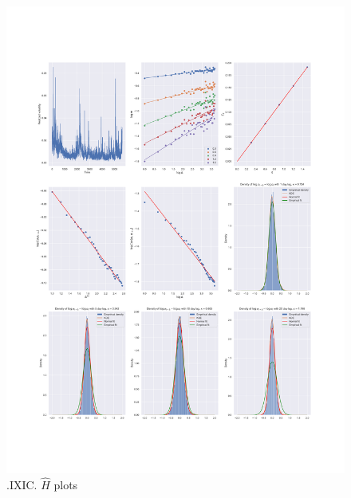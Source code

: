 	\begin{figure}[h]
		\centering
		\includegraphics[width=\linewidth]{fig/.IXIC.pdf}
		\caption{.IXIC. $\hat{H}$ plots}
	\end{figure}

